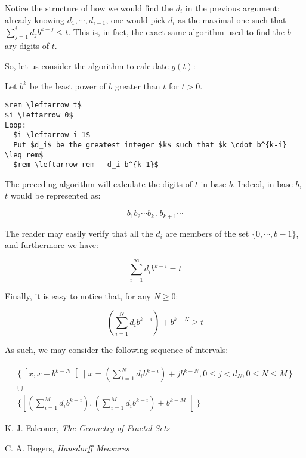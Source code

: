 \documentclass[11pt]{amsart}
\begin{document}
\bigskip

Notice the structure of how we would find the $d_i$ in the previous argument: already knowing $d_1, \cdots, d_{i-1}$, one would pick $d_i$ as the maximal one such that $\sum_{j = 1}^i d_j b^{k-j} \leq t$. This is, in fact, the exact same algorithm used to find the $b$-ary digits of $t$.

So, let us consider the algorithm to calculate $g(t)$:

Let $b^k$ be the least power of $b$ greater than $t$ for $t > 0$.

\begin{lstlisting}
$rem \leftarrow t$
$i \leftarrow 0$
Loop:
  $i \leftarrow i-1$
  Put $d_i$ be the greatest integer $k$ such that $k \cdot b^{k-i} \leq rem$
  $rem \leftarrow rem - d_i b^{k-1}$
\end{lstlisting}

The preceding algorithm will calculate the digits of $t$ in base $b$. Indeed, in base $b$, $t$ would be represented as:

\[b_1 b_2 \cdots b_k \, . \, b_{k+1} \cdots\]


The reader may easily verify that all the $d_i$ are members of the set $\{ 0, \cdots, b-1\}$, and furthermore we have:

\[\sum_{i = 1}^\infty d_i b^{k-i} = t\]

Finally, it is easy to notice that, for any $N \geq 0$:

\[(\sum_{i=1}^N d_i b^{k-i}) + b^{k-N} \geq t\]

As such, we may consider the following sequence of intervals:

\begin{multline*}
\{\, \left[ x , x + b^{k-N} \right[ \mid x = (\sum_{i=1}^N d_i b^{k-i}) + j b^{k-N}, 0 \leq j < d_N, 0 \leq N \leq M\,\}\\
\cup\\
\{\left[ (\sum_{i=1}^M d_i b^{k-i}) ,(\sum_{i=1}^M d_i b^{k-i}) + b^{k-M} \right[\}
\end{multline*}

\begin{thebibliography}{1}
K. J. Falconer, \textit{The Geometry of Fractal Sets}

C. A. Rogers, \textit{Hausdorff Measures}

\end{thebibliography}
\end{document}
